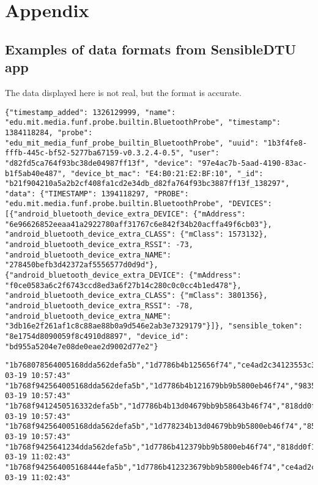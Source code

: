 \chapter{Appendix}

\section{Examples of data formats from SensibleDTU app}

The data displayed here is not real, but the format is accurate. 

\begin{lstlisting}
{"timestamp_added": 1326129999, "name": "edu.mit.media.funf.probe.builtin.BluetoothProbe", "timestamp": 1384118284, "probe": "edu_mit_media_funf_probe_builtin_BluetoothProbe", "uuid": "1b3f4fe8-fffb-445c-bf52-5277ba67159-v0.3.2.4-0.5", "user": "d82fd5ca764f93bc38de04987ff13f", "device": "97e4ac7b-5aad-4190-83ac-b1f5ab40e487", "device_bt_mac": "E4:B0:21:E2:BF:10", "_id": "b21f904210a5a2b2cf408fa1cd2e34db_d82fa764f93bc3887ff13f_138297", "data": {"TIMESTAMP": 1394118297, "PROBE": "edu.mit.media.funf.probe.builtin.BluetoothProbe", "DEVICES": [{"android_bluetooth_device_extra_DEVICE": {"mAddress": "6e96626852eeaa41a2922780aff31767c6e842f34b20acffa49f6cb03"}, "android_bluetooth_device_extra_CLASS": {"mClass": 1573132}, "android_bluetooth_device_extra_RSSI": -73, "android_bluetooth_device_extra_NAME": "278450befb3d42372af5556577d0d9d"}, {"android_bluetooth_device_extra_DEVICE": {"mAddress": "f0ce0583a6c2f6743ccd8ed3a6f27b14c280c0c0cc4b1ed478"}, "android_bluetooth_device_extra_CLASS": {"mClass": 3801356}, "android_bluetooth_device_extra_RSSI": -78, "android_bluetooth_device_extra_NAME": "3db16e2f261af1c8c88ae88b0a9d546e2ab3e7329179"}]}, "sensible_token": "8e1754d8090059f8c4910d8897", "device_id": "bd955a5204e7e08de0eae2d9002d77e2"}
\end{lstlisting}

\begin{lstlisting}
"1b768078564005168dda562defa5b","1d7786b4b125656f74","ce4ad2c34123553c3b72b60e4eab19971456f5f391ed7","-82","2014-03-19 10:57:43"
"1b768f942564005168dda562defa5b","1d7786b4b121679bb9b5800eb46f74","9835c86c172aa3398564112455b42f54009a1ce37478d905f998d3f6c7","-73","2014-03-19 10:57:43"
"1b768f9412450516332defa5b","1d7786b4b13d04679bb9b58643b46f74","818dd0f1afd862c52b112262709c641b1995567ba28c3c20e","-57","2014-03-19 10:57:43"
"1b768f942564005168dda562defa5b","1d778234b13d04679bb9b5800eb46f74","8547c45679a561f8cbfff70de8572f161206ea06ce380a973","-88","2014-03-19 10:57:43"
"1b768f9425641234dda562defa5b","1d7786b412379bb9b5800eb46f74","818dd0f1afd862c52b8bdd65c37562709c641b19977c4ba1315057ba28c3c20e","-55","2014-03-19 11:02:43"
"1b768f942564005168444efa5b","1d7786b412323679bb9b5800eb46f74","ce4ad2c3477aef48ca1431004c023c3b72b60e4eab199712391ed7","-90","2014-03-19 11:02:43"
\end{lstlisting}
